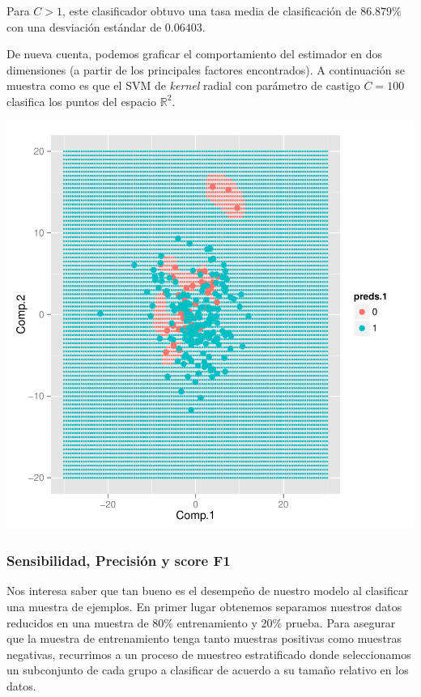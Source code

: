 \documentclass{article}
\begin{document}
Para $C > 1$, este clasificador obtuvo una tasa media de clasificación de $86.879\%$ con una desviación estándar de $0.06403$. 

De nueva cuenta, podemos graficar el comportamiento del estimador en dos dimensiones (a partir de los principales factores encontrados). A continuación se muestra como es que el SVM de \emph{kernel} radial con parámetro de castigo $C = 100$ clasifica los puntos del espacio $\mathbb{R}^2$. 

\begin{Schunk}
\end{Schunk}
\includegraphics{Final-007}
\subsubsection{Sensibilidad, Precisión y score F1}
Nos interesa saber que tan bueno es el desempeño de nuestro modelo al clasificar una muestra de ejemplos. En primer lugar obtenemos separamos nuestros datos reducidos en una muestra de 80\% entrenamiento y 20\% prueba. Para asegurar que la muestra de entrenamiento tenga tanto muestras positivas como muestras negativas, recurrimos a un proceso de muestreo estratificado donde seleccionamos un subconjunto de cada grupo a clasificar de acuerdo a su tamaño relativo en los datos.
\end{document}
